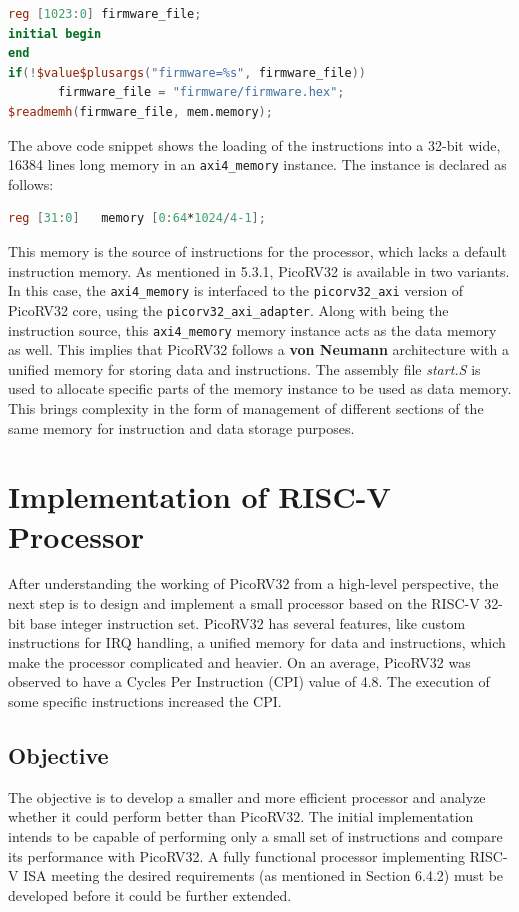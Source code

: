 \begin{lstlisting}[language=Verilog]
reg [1023:0] firmware_file;
initial begin
end
if(!$value$plusargs("firmware=%s", firmware_file))
       firmware_file = "firmware/firmware.hex";
$readmemh(firmware_file, mem.memory);
\end{lstlisting}
The above code snippet shows the loading of the instructions into a 32-bit wide, 16384 lines long memory in an \verb|axi4_memory| instance. The instance is declared as follows:\newline
\begin{lstlisting}[language=Verilog]
reg [31:0]   memory [0:64*1024/4-1];
\end{lstlisting}
This memory is the source of instructions for the processor, which lacks a default instruction memory. As mentioned in 5.3.1, PicoRV32 is available in two variants. In this case, the \verb|axi4_memory| is interfaced to the \verb|picorv32_axi| version of PicoRV32 core, using the \verb|picorv32_axi_adapter|. \newline\newline
Along with being the instruction source, this \verb|axi4_memory| memory instance acts as the data memory as well. This implies that PicoRV32 follows a \textbf{von Neumann} architecture with a unified memory for storing data and instructions. The assembly file \textit{start.S} is used to allocate specific parts of the memory instance to be used as data memory. This brings complexity in the form of management of different sections of the same memory for instruction and data storage purposes.



 \section{Implementation of RISC-V Processor}
 \label{sect6_4}
After understanding the working of PicoRV32 from a high-level perspective, the next step is to design and implement a small processor based on the RISC-V 32-bit base integer instruction set. PicoRV32 has several features, like custom instructions for IRQ handling, a unified memory for data and instructions, which make the processor complicated and heavier.\newline\newline
On an average, PicoRV32 was observed to have a Cycles Per Instruction (CPI) value of 4.8. The execution of some specific instructions increased the CPI. 

\subsection{Objective}
\label{sect6_4_1}
The objective is to develop a smaller and more efficient processor and analyze whether it could perform better than PicoRV32. The initial implementation intends to be capable of performing only a small set of instructions and compare its performance with PicoRV32. A fully functional processor implementing RISC-V ISA meeting the desired requirements (as mentioned in Section 6.4.2) must be developed before it could be further extended. 


